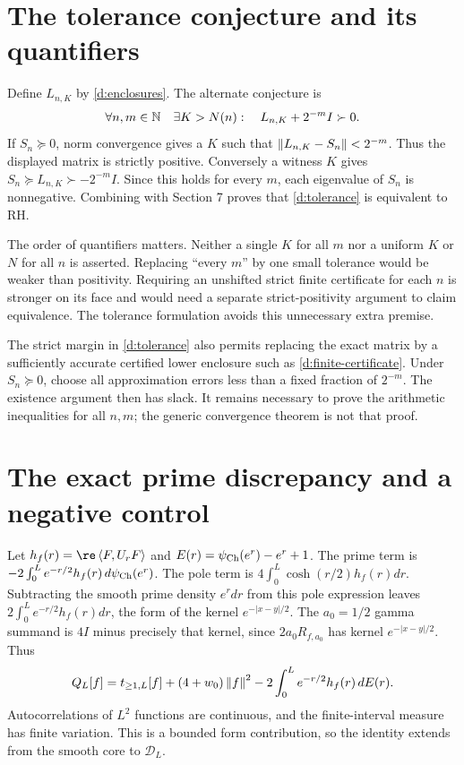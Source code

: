 \section{The tolerance conjecture and its quantifiers}
Define $L_{n,K}$ by \eqref{d:enclosures}. The alternate conjecture is
\begin{equation}\label{d:tolerance}
\forall n,m\in\mathbb N\quad\exists K>N(n):\quad
L_{n,K}+2^{-m}I\succ0.
\end{equation}
If $S_n\succeq0$, norm convergence gives a $K$ such that
$\left\lVert L_{n,K}-S_n\right\rVert<2^{-m}$. Thus the displayed matrix is strictly
positive. Conversely a witness $K$ gives
$S_n\succeq L_{n,K}\succ-2^{-m}I$. Since this holds for every $m$,
each eigenvalue of $S_n$ is nonnegative. Combining with Section 7 proves
that \eqref{d:tolerance} is equivalent to RH.

The order of quantifiers matters. Neither a single $K$ for all $m$ nor a
uniform $K$ or $N$ for all $n$ is asserted. Replacing ``every $m$'' by one
small tolerance would be weaker than positivity. Requiring an unshifted
strict finite certificate for each $n$ is stronger on its face and would
need a separate strict-positivity argument to claim equivalence.
The tolerance formulation avoids this unnecessary extra premise.

The strict margin in \eqref{d:tolerance} also permits replacing the exact
matrix by a sufficiently accurate certified lower enclosure such as
\eqref{d:finite-certificate}. Under $S_n\succeq0$, choose all approximation
errors less than a fixed fraction of $2^{-m}$. The existence argument
then has slack. It remains necessary to prove the arithmetic inequalities
for all $n,m$; the generic convergence theorem is not that proof.

\section{The exact prime discrepancy and a negative control}
Let $h_f(r)=\re\ip F{U_rF}$ and
$E(r)=\psi_{\rm Ch}(e^r)-e^r+1$. The prime term is
$-2\int_0^L e^{-r/2}h_f(r)\,d\psi_{\rm Ch}(e^r)$.
The pole term is $4\int_0^L\cosh(r/2)h_f(r)dr$.
Subtracting the smooth prime density $e^rdr$ from this pole expression
leaves $2\int_0^Le^{-r/2}h_f(r)dr$, the form of the kernel
$e^{-|x-y|/2}$. The $a_0=1/2$ gamma summand is $4I$ minus precisely
that kernel, since $2a_0R_{f,a_0}$ has kernel $e^{-|x-y|/2}$.
Thus
\begin{equation}\label{d:discrepancy}
Q_L[f]=t_{\ge1,L}[f]+(4+w_0)\left\lVert f\right\rVert^2
-2\int_0^Le^{-r/2}h_f(r)\,dE(r).
\end{equation}
Autocorrelations of $L^2$ functions are continuous, and the finite-interval
measure has finite variation. This is a bounded form contribution, so
the identity extends from the smooth core to $\mathcal D_L$.

